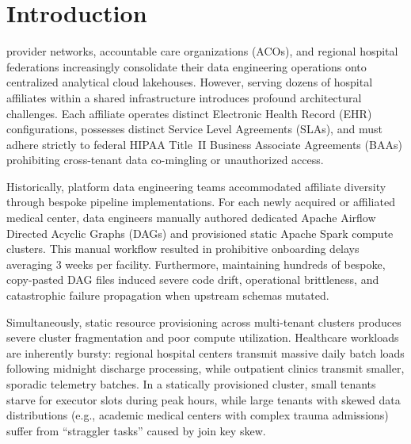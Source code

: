 \documentclass[10pt,journal,compsoc]{IEEEtran}
\begin{document}
\section{Introduction}
 provider networks, accountable care organizations (ACOs), and regional hospital federations increasingly consolidate their data engineering operations onto centralized analytical cloud lakehouses. However, serving dozens of hospital affiliates within a shared infrastructure introduces profound architectural challenges. Each affiliate operates distinct Electronic Health Record (EHR) configurations, possesses distinct Service Level Agreements (SLAs), and must adhere strictly to federal HIPAA Title~II Business Associate Agreements (BAAs) prohibiting cross-tenant data co-mingling or unauthorized access.

Historically, platform data engineering teams accommodated affiliate diversity through bespoke pipeline implementations. For each newly acquired or affiliated medical center, data engineers manually authored dedicated Apache Airflow Directed Acyclic Graphs (DAGs) and provisioned static Apache Spark compute clusters. This manual workflow resulted in prohibitive onboarding delays averaging 3 weeks per facility. Furthermore, maintaining hundreds of bespoke, copy-pasted DAG files induced severe code drift, operational brittleness, and catastrophic failure propagation when upstream schemas mutated.

Simultaneously, static resource provisioning across multi-tenant clusters produces severe cluster fragmentation and poor compute utilization. Healthcare workloads are inherently bursty: regional hospital centers transmit massive daily batch loads following midnight discharge processing, while outpatient clinics transmit smaller, sporadic telemetry batches. In a statically provisioned cluster, small tenants starve for executor slots during peak hours, while large tenants with skewed data distributions (e.g., academic medical centers with complex trauma admissions) suffer from ``straggler tasks'' caused by join key skew.
\end{document}
